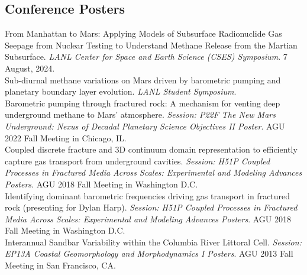 \documentclass[11pt, letterpaper]{article}
\newcommand{\years}[1]{\marginnote{\scriptsize #1}}
\begin{document}
\subsection*{Conference Posters}
%
\years{2024}
From Manhattan to Mars: Applying Models of Subsurface
Radionuclide Gas Seepage from Nuclear Testing to Understand Methane Release
from the Martian Subsurface. \textit{LANL Center for Space and Earth Science (CSES)
Symposium}. 7 August, 2024.\\ 
%
\years{2023}
Sub-diurnal methane variations on Mars driven by barometric pumping and
planetary boundary layer evolution. \textit{LANL Student Symposium}.\\
%
\years{2022}
Barometric pumping through fractured rock: A
mechanism for venting deep underground methane to Mars' atmosphere.
\textit{Session: P22F The New Mars Underground: Nexus of Decadal Planetary
Science Objectives II Poster}. AGU 2022 Fall Meeting in Chicago, IL.
\AGUFallMeetingAbstraOOOOBarometricPumpingThr\\ 
%
\years{2018}
Coupled discrete fracture and 3D continuum domain representation
to efficiently capture gas transport from underground cavities.
\textit{Session: H51P Coupled Processes in Fractured Media Across Scales:
Experimental and Modeling Advances Posters}. AGU 2018 Fall Meeting in
Washington D.C. \\
%
\years{2018}
Identifying dominant barometric
frequencies driving gas transport in fractured rock (presenting for Dylan
Harp). \textit{Session: H51P Coupled Processes in Fractured Media Across
Scales: Experimental and Modeling Advances Posters}. AGU 2018 Fall Meeting in
Washington D.C. 
\AGUFallMeetingOOOOIdentifyingdominantb\\
%
\years{2013}
Interannual Sandbar Variability within the Columbia River Littoral Cell.
\textit{Session: EP13A Coastal Geomorphology and Morphodynamics I Posters}.
AGU 2013 Fall Meeting in San Francisco, CA.
\end{document}
